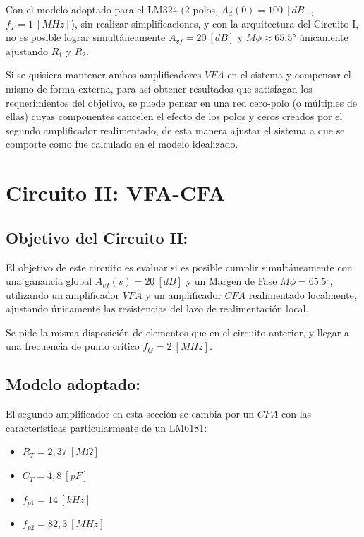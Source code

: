 \documentclass[12pt,a4paper]{article}
\begin{document}
Con el modelo adoptado para el LM324 (2 polos, $A_d(0)=100~[dB]$, $f_T=1~[MHz]$), sin realizar simplificaciones, y con la arquitectura del Circuito I, no es posible lograr simultáneamente $A_{vf}=20~[dB]$ y $M\phi \approx \ang{65,5}$ únicamente ajustando $R_1$ y $R_2$.

Si se quisiera mantener ambos amplificadores $VFA$ en el sistema y compensar el mismo de forma externa, para así obtener resultados que satisfagan los requerimientos del objetivo, se puede pensar en una red cero-polo (o múltiples de ellas) cuyas componentes cancelen el efecto de los polos y ceros creados por el segundo amplificador realimentado, de esta manera ajustar el sistema a que se comporte como fue calculado en el modelo idealizado.

\newpage
\section{Circuito II: VFA-CFA}

\subsection{Objetivo del Circuito II:}

El objetivo de este circuito es evaluar si es posible cumplir simultáneamente con una ganancia global $A_{vf}(s) = 20~[dB]$ y un Margen de Fase $M\phi = \ang{65,5}$, utilizando un amplificador $VFA$ y un amplificador $CFA$ realimentado localmente, ajustando únicamente las resistencias del lazo de realimentación local.

Se pide la misma disposición de elementos que en el circuito anterior, y llegar a una frecuencia de punto crítico $f_G=2~[MHz]$.
\\

\subsection{Modelo adoptado:}

El segundo amplificador en esta sección se cambia por un $CFA$ con las características particularmente de un LM6181:

\begin{itemize}
    \item $R_T = 2,37~[M\Omega]$
    \item $C_T = 4,8~[pF]$
    \item $f_{p1} = 14~[kHz]$        
    \item $f_{p2} = 82,3~[MHz]$
\end{itemize}
\hspace{0.5 cm}
\end{document}
